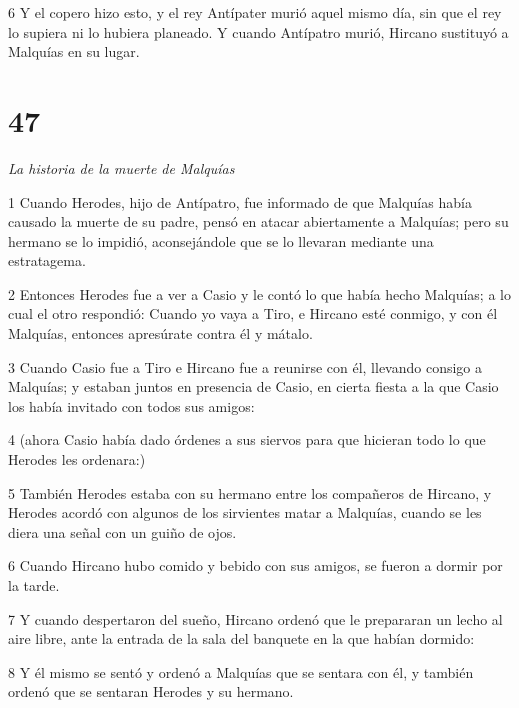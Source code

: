 \par 6 Y el copero hizo esto, y el rey Antípater murió aquel mismo día, sin que el rey lo supiera ni lo hubiera planeado. Y cuando Antípatro murió, Hircano sustituyó a Malquías en su lugar.

\chapter{47}

\par \textit{La historia de la muerte de Malquías}

\par 1 Cuando Herodes, hijo de Antípatro, fue informado de que Malquías había causado la muerte de su padre, pensó en atacar abiertamente a Malquías; pero su hermano se lo impidió, aconsejándole que se lo llevaran mediante una estratagema.

\par 2 Entonces Herodes fue a ver a Casio y le contó lo que había hecho Malquías; a lo cual el otro respondió: Cuando yo vaya a Tiro, e Hircano esté conmigo, y con él Malquías, entonces apresúrate contra él y mátalo.

\par 3 Cuando Casio fue a Tiro e Hircano fue a reunirse con él, llevando consigo a Malquías; y estaban juntos en presencia de Casio, en cierta fiesta a la que Casio los había invitado con todos sus amigos:

\par 4 (ahora Casio había dado órdenes a sus siervos para que hicieran todo lo que Herodes les ordenara:)

\par 5 También Herodes estaba con su hermano entre los compañeros de Hircano, y Herodes acordó con algunos de los sirvientes matar a Malquías, cuando se les diera una señal con un guiño de ojos.

\par 6 Cuando Hircano hubo comido y bebido con sus amigos, se fueron a dormir por la tarde.

\par 7 Y cuando despertaron del sueño, Hircano ordenó que le prepararan un lecho al aire libre, ante la entrada de la sala del banquete en la que habían dormido:

\par 8 Y él mismo se sentó y ordenó a Malquías que se sentara con él, y también ordenó que se sentaran Herodes y su hermano.

